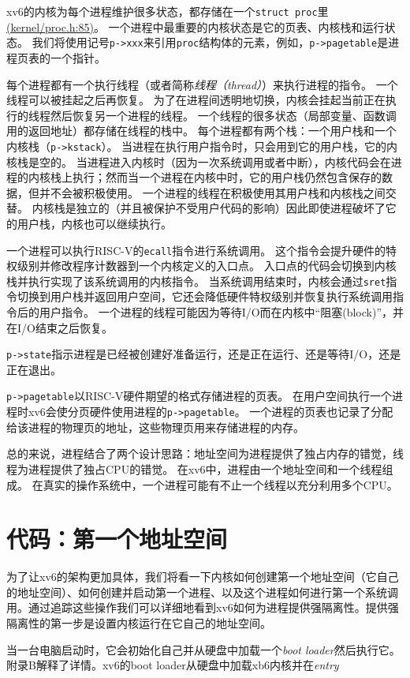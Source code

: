 xv6的内核为每个进程维护很多状态，都存储在一个\texttt{struct proc}里\href{https://github.com/mit-pdos/xv6-riscv/blob/riscv//kernel/proc.h#L85}{(kernel/proc.h:85)}。
一个进程中最重要的内核状态是它的页表、内核栈和运行状态。
我们将使用记号\texttt{p->xxx}来引用\texttt{proc}结构体的元素，例如，\texttt{p->pagetable}是进程页表的一个指针。

每个进程都有一个执行线程（或者简称\emph{线程（thread）}）来执行进程的指令。
一个线程可以被挂起之后再恢复。
为了在进程间透明地切换，内核会挂起当前正在执行的线程然后恢复另一个进程的线程。
一个线程的很多状态（局部变量、函数调用的返回地址）都存储在线程的栈中。
每个进程都有两个栈：一个用户栈和一个内核栈（\texttt{p->kstack}）。
当进程在执行用户指令时，只会用到它的用户栈，它的内核栈是空的。
当进程进入内核时（因为一次系统调用或者中断），内核代码会在进程的内核栈上执行；然而当一个进程在内核中时，它的用户栈仍然包含保存的数据，但并不会被积极使用。
一个进程的线程在积极使用其用户栈和内核栈之间交替。
内核栈是独立的（并且被保护不受用户代码的影响）因此即使进程破坏了它的用户栈，内核也可以继续执行。

一个进程可以执行RISC-V的\texttt{ecall}指令进行系统调用。
这个指令会提升硬件的特权级别并修改程序计数器到一个内核定义的入口点。
入口点的代码会切换到内核栈并执行实现了该系统调用的内核指令。
当系统调用结束时，内核会通过\texttt{sret}指令切换到用户栈并返回用户空间，它还会降低硬件特权级别并恢复执行系统调用指令后的用户指令。
一个进程的线程可能因为等待I/O而在内核中“阻塞(block)”，并在I/O结束之后恢复。

\texttt{p->state}指示进程是已经被创建好准备运行，还是正在运行、还是等待I/O，还是正在退出。

\texttt{p->pagetable}以RISC-V硬件期望的格式存储进程的页表。
在用户空间执行一个进程时xv6会使分页硬件使用进程的\texttt{p->pagetable}。
一个进程的页表也记录了分配给该进程的物理页的地址，这些物理页用来存储进程的内存。

总的来说，进程结合了两个设计思路：地址空间为进程提供了独占内存的错觉，线程为进程提供了独占CPU的错觉。
在xv6中，进程由一个地址空间和一个线程组成。
在真实的操作系统中，一个进程可能有不止一个线程以充分利用多个CPU。

\section{代码：第一个地址空间}
为了让xv6的架构更加具体，我们将看一下内核如何创建第一个地址空间（它自己的地址空间）、如何创建并启动第一个进程、以及这个进程如何进行第一个系统调用。通过追踪这些操作我们可以详细地看到xv6如何为进程提供强隔离性。提供强隔离性的第一步是设置内核运行在它自己的地址空间。

当一台电脑启动时，它会初始化自己并从硬盘中加载一个\emph{boot loader}然后执行它。附录B解释了详情。xv6的boot loader从硬盘中加载xb6内核并在\emph{entry}
